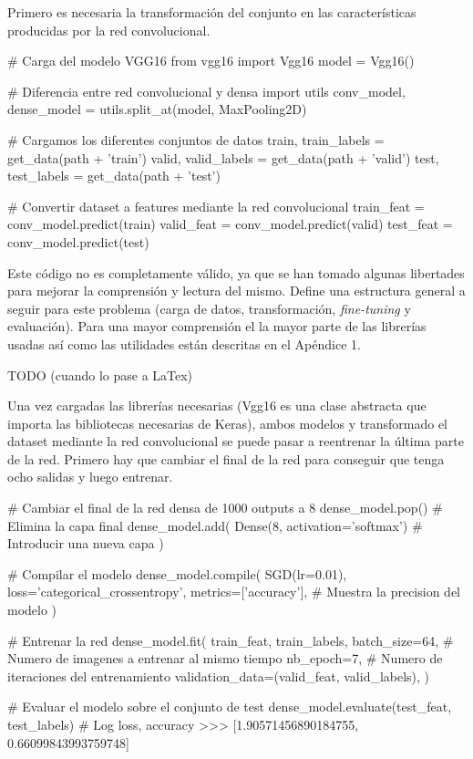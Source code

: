 Primero es necesaria la transformación del conjunto en las características producidas por la red convolucional.

\begin{python}
# Carga del modelo VGG16
from vgg16 import Vgg16
model = Vgg16()

# Diferencia entre red convolucional y densa
import utils
conv_model, dense_model = utils.split_at(model, MaxPooling2D)

# Cargamos los diferentes conjuntos de datos
train, train_labels = get_data(path + 'train')
valid, valid_labels = get_data(path + 'valid')
test, test_labels = get_data(path + 'test')

# Convertir dataset a features mediante la red convolucional
train_feat = conv_model.predict(train)
valid_feat = conv_model.predict(valid)
test_feat = conv_model.predict(test)
\end{python}

Este código no es completamente válido, ya que se han tomado algunas libertades para mejorar la comprensión y lectura del mismo. Define una estructura general a seguir para este problema (carga de datos, transformación, \textit{fine-tuning} y evaluación). Para una mayor comprensión el la mayor parte de las librerías usadas así como las utilidades están descritas en el Apéndice 1.

TODO (cuando lo pase a LaTex)

Una vez cargadas las librerías necesarias (Vgg16 es una clase abstracta que importa las bibliotecas necesarias de Keras), ambos modelos y transformado el dataset mediante la red convolucional se puede pasar a reentrenar la última parte de la red. Primero hay que cambiar el final de la red para conseguir que tenga ocho salidas y luego entrenar.


\begin{python}

# Cambiar el final de la red densa de 1000 outputs a 8
dense_model.pop()  # Elimina la capa final
dense_model.add(
    Dense(8, activation='softmax')  # Introducir una nueva capa
)

# Compilar el modelo
dense_model.compile(
    SGD(lr=0.01),
    loss='categorical_crossentropy',
    metrics=['accuracy'],  # Muestra la precision del modelo
)

# Entrenar la red
dense_model.fit(
    train_feat,
    train_labels,
    batch_size=64,  # Numero de imagenes a entrenar al mismo tiempo
    nb_epoch=7,     # Numero de iteraciones del entrenamiento
    validation_data=(valid_feat, valid_labels),
)

# Evaluar el modelo sobre el conjunto de test
dense_model.evaluate(test_feat, test_labels)
# Log loss, accuracy
>>> [1.90571456890184755, 0.66099843993759748]
\end{python}

